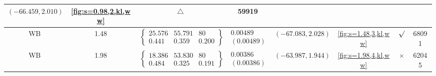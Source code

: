 \begin{table}[H]
\begin{adjustwidth}{-2.5cm}{-2.5cm}
{\begin{tabular}{|c|c|c|c|c|c|c|c|}
$(-66.459, 2.010)$ & 
\ref{fig:s=0.98,2,kl,ww} & $\triangle$ & 59919 \\
\hline
WB & 1.48 & $\left\{\begin{array}{ccc}
25.576 & 55.791 & 80 \\
0.441 & 0.359 & 0.200
\end{array}\right\}$ &
$\begin{array}{c}
0.00489 \\
(0.00489)
\end{array}$ & 
$(-67.083, 2.028)$ & 
\ref{fig:s=1.48,3,kl,ww} & $\surd$ & 68091 \\
\hline
WB & 1.98 & $\left\{\begin{array}{ccc}
18.386 & 53.830 & 80 \\
0.484 & 0.325 & 0.191
\end{array}\right\}$ &
$\begin{array}{c}
0.00386 \\
(0.00386)
\end{array}$ & 
$(-63.987, 1.944)$ & 
\ref{fig:s=1.98,4,kl,ww} & $\times$ & 62045 \\
\hline
\end{tabular}
}
\end{adjustwidth}
\end{table}

